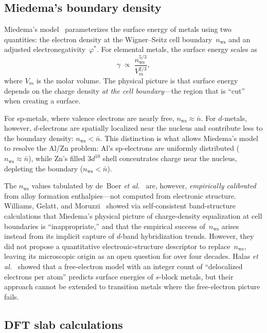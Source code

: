 \documentclass[twocolumn,showpacs,preprintnumbers,amsmath,amssymb,prb]{revtex4-2}
\begin{document}
\subsection{Miedema's boundary density}

Miedema's model~\cite{Miedema1978,deBoer1988} parameterizes
the surface energy of metals using two quantities:
the electron density at the Wigner--Seitz cell
boundary~$n_\mathrm{ws}$ and an adjusted
electronegativity~$\varphi^*$.
For elemental metals, the surface energy scales as
\begin{equation}
  \gamma \;\propto\; \frac{n_\mathrm{ws}^{5/3}}{V_m^{2/3}},
  \label{eq:miedema}
\end{equation}
where $V_m$ is the molar volume.
The physical picture is that surface energy depends on the
charge density \emph{at the cell boundary}---the region
that is ``cut'' when creating a surface.

For sp-metals, where valence electrons are nearly free,
$n_\mathrm{ws} \approx \bar{n}$.
For $d$-metals, however, $d$-electrons are spatially
localized near the nucleus and contribute less to the
boundary density: $n_\mathrm{ws} < \bar{n}$.
This distinction is what allows Miedema's model to resolve
the Al/Zn problem:
Al's sp-electrons are uniformly distributed
($n_\mathrm{ws} \approx \bar{n}$),
while Zn's filled $3d^{10}$ shell concentrates charge near
the nucleus, depleting the boundary
($n_\mathrm{ws} < \bar{n}$).

The $n_\mathrm{ws}$ values tabulated by
de~Boer \textit{et al.}~\cite{deBoer1988} are, however,
\emph{empirically calibrated} from alloy formation
enthalpies---not computed from electronic structure.
Williams, Gelatt, and Moruzzi~\cite{WilliamsGelattMoruzzi1980}
showed via self-consistent band-structure calculations that
Miedema's physical picture of charge-density equalization at
cell boundaries is ``inappropriate,'' and that the empirical
success of~$n_\mathrm{ws}$ arises instead from its implicit
capture of $d$-band hybridization trends.
However, they did not propose a quantitative
electronic-structure descriptor to replace~$n_\mathrm{ws}$,
leaving its microscopic origin as an open question for
over four decades.
Halas \textit{et al.}~\cite{Halas2002} showed that a
free-electron model with an integer count of ``delocalized
electrons per atom'' predicts surface energies of $s$-block
metals, but their approach cannot be extended to transition
metals where the free-electron picture fails.

\subsection{DFT slab calculations}
\end{document}

